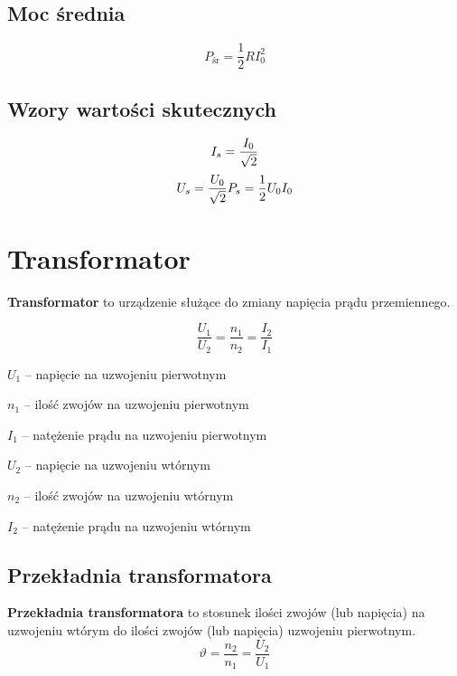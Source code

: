 \subsection{Moc średnia}
\begin{equation}
  P_\text{śr} = \frac 12RI_0^2
\end{equation}

\subsection{Wzory wartości skutecznych}
\begin{subequations}
  \setlength\jot{5pt}
  \begin{gather}
    I_s = \frac{I_0}{\sqrt 2}\\
    U_s = \frac{U_0}{\sqrt 2}
    P_s = \frac 12U_0I_0\\
  \end{gather}
\end{subequations}

\section{Transformator}
\begin{definition}
  \textbf{Transformator} to urządzenie służące do zmiany napięcia prądu przemiennego.

  \begin{equation}
    \frac{U_1}{U_2} = \frac{n_1}{n_2} = \frac{I_2}{I_1}
  \end{equation}
  \begin{symbols}
    \item $U_1$ -- napięcie na uzwojeniu pierwotnym
    \item $n_1$ -- ilość zwojów na uzwojeniu pierwotnym
    \item $I_1$ -- natężenie prądu na uzwojeniu pierwotnym
      \vspace{10pt}
    \item $U_2$ -- napięcie na uzwojeniu wtórnym
    \item $n_2$ -- ilość zwojów na uzwojeniu wtórnym
    \item $I_2$ -- natężenie prądu na uzwojeniu wtórnym
  \end{symbols}
\end{definition}

\subsection{Przekładnia transformatora}
\begin{definition}
  \textbf{Przekładnia transformatora} to stosunek ilości zwojów (lub napięcia) na uzwojeniu wtórym
  do ilości zwojów (lub napięcia) uzwojeniu pierwotnym.
  \begin{equation}
    \vartheta = \frac{n_2}{n_1} = \frac{U_2}{U_1}
  \end{equation}
\end{definition}
